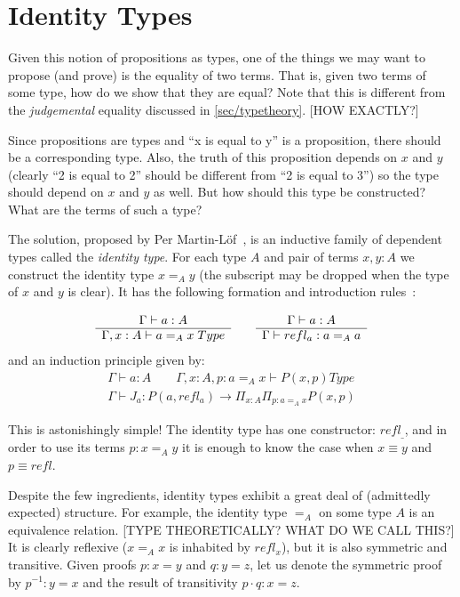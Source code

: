 \section{Identity Types}\label{sec/identitytypes}

Given this notion of propositions as types, one of the things we may want to
propose (and prove) is the equality of two terms. That is, given two terms of
some type, how do we show that they are equal? Note that this is different from
the \emph{judgemental} equality discussed in \autoref{sec/typetheory}. [HOW EXACTLY?]

Since propositions are types and ``x is equal to y'' is a proposition, there
should be a corresponding type. Also, the truth of this proposition depends on
$x$ and $y$ (clearly ``2 is equal to 2'' should be different from ``2 is equal
to 3'') so the type should depend on $x$ and $y$ as well. But how should this
type be constructed? What are the terms of such a type?

The solution, proposed by Per Martin-Löf~\cite{ML75}, is an inductive family of dependent
types called the \emph{identity type}. For each type $A$ and pair of terms
$x,y:A$ we construct the identity type $x =_A y$ (the subscript may be dropped
when the type of $x$ and $y$ is clear). It has the following formation and introduction
rules~\cite{Rijke2019}:

\[
  \begin{array}[t]{c}
    \Gamma \vdash a:A\\
    \hline
    \Gamma, x:A \vdash a =_A x \; Type\\
  \end{array}
  \qquad
  \begin{array}[t]{c}
    \Gamma \vdash a:A\\
    \hline
    \Gamma \vdash refl_a : a =_A a
  \end{array}
\]
and an induction principle given by:
\[
  \begin{array}{c}
    \Gamma \vdash a:A \qquad \Gamma, x:A, p:a =_A x \vdash P (x,p) Type\\
    \hline
    \Gamma \vdash J_a : P (a, refl_a) \rightarrow \Pi_{x:A}\Pi_{p:a=_Ax}P
    (x, p)
  \end{array}
\]

This is astonishingly simple! The identity type has one constructor: $refl_{\_}$,
and in order to use its terms $p : x =_A y$ it is enough to know the case when $x
\equiv y$ and $p \equiv refl$.

Despite the few ingredients, identity types exhibit a great deal of (admittedly
expected) structure. For example, the identity type $=_A$ on some type $A$ is an
equivalence relation. [TYPE THEORETICALLY? WHAT DO WE CALL THIS?] It is clearly
reflexive ($x =_A x$ is inhabited by $refl_x$), but it is also symmetric and
transitive. Given proofs $p : x = y$ and $q : y = z$, let us denote the
symmetric proof by $p^{-1} : y = x$ and the result of transitivity $p \cdot q : x
= z$.

